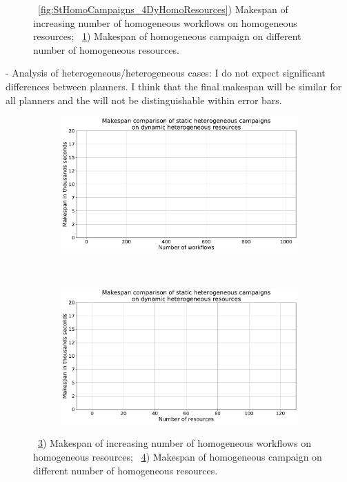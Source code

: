 \begin{figure}[ht!]
\begin{subfigure}[b]{0.45\textwidth}
        \caption{}
        \label{fig:DyHomoResources_StHomoCampaigns}
    \end{subfigure}
    \caption{~\ref{fig:StHomoCampaigns_4DyHomoResources}) Makespan of increasing number of homogeneous workflows on homogeneous resources;
        ~\ref{fig:DyHomoResources_StHomoCampaigns}) Makespan of homogeneous campaign on different number of homogeneous resources.}
    \label{fig:no_replan_homog_analysis}
\end{figure}


- Analysis of heterogeneous/heterogeneous cases:
I do not expect significant differences between planners.
I think that the final makespan will be similar for all planners and the will not be distinguishable within error bars.
\begin{figure}[ht!]
    \centering
    \begin{subfigure}[b]{0.45\textwidth}
        \includegraphics[width=.95\textwidth]{figures/campaign/StHeteroCampaigns_4DyHeteroResources.pdf}
        \caption{}
        \label{fig:StHeteroCampaigns_4DyHeteroResources}
    \end{subfigure}%
    ~ 
    \begin{subfigure}[b]{0.45\textwidth}
        \includegraphics[width=\linewidth]{figures/campaign/DyHeteroResources_StHeteroCampaigns.pdf}
        \caption{}
        \label{fig:DyHeteroResources_StHeteroCampaigns}
    \end{subfigure}
    \caption{~\ref{fig:StHeteroCampaigns_4DyHeteroResources}) Makespan of increasing number of homogeneous workflows on homogeneous resources;
        ~\ref{fig:DyHeteroResources_StHeteroCampaigns}) Makespan of homogeneous campaign on different number of homogeneous resources.}
    \label{fig:no_replan_hetero_analysis}
\end{figure}

